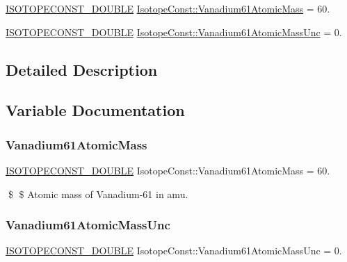 \begin{DoxyCompactItemize}
\item 
\mbox{\hyperlink{group___isotope_const-_macros_ga8f45a7272ce02c0b4c65c44636ed719a}{I\+S\+O\+T\+O\+P\+E\+C\+O\+N\+S\+T\+\_\+\+D\+O\+U\+B\+LE}} \mbox{\hyperlink{group___isotope_const-_vanadium-_v61_gaba2f25b1780fc9953d9ce5ebc96584cf}{Isotope\+Const\+::\+Vanadium61\+Atomic\+Mass}} = 60.
\item 
\mbox{\hyperlink{group___isotope_const-_macros_ga8f45a7272ce02c0b4c65c44636ed719a}{I\+S\+O\+T\+O\+P\+E\+C\+O\+N\+S\+T\+\_\+\+D\+O\+U\+B\+LE}} \mbox{\hyperlink{group___isotope_const-_vanadium-_v61_gae93ad228edad2cf164ad4f3a97a0b0a8}{Isotope\+Const\+::\+Vanadium61\+Atomic\+Mass\+Unc}} = 0.
\end{DoxyCompactItemize}


\subsection{Detailed Description}


\subsection{Variable Documentation}
\mbox{\label{group___isotope_const-_vanadium-_v61_gaba2f25b1780fc9953d9ce5ebc96584cf}} 
\subsubsection{\texorpdfstring{Vanadium61\+Atomic\+Mass}{Vanadium61AtomicMass}}
{\footnotesize\ttfamily \mbox{\hyperlink{group___isotope_const-_macros_ga8f45a7272ce02c0b4c65c44636ed719a}{I\+S\+O\+T\+O\+P\+E\+C\+O\+N\+S\+T\+\_\+\+D\+O\+U\+B\+LE}} Isotope\+Const\+::\+Vanadium61\+Atomic\+Mass = 60.}

\$ \$ Atomic mass of Vanadium-\/61 in amu. \mbox{\label{group___isotope_const-_vanadium-_v61_gae93ad228edad2cf164ad4f3a97a0b0a8}} 
\subsubsection{\texorpdfstring{Vanadium61\+Atomic\+Mass\+Unc}{Vanadium61AtomicMassUnc}}
{\footnotesize\ttfamily \mbox{\hyperlink{group___isotope_const-_macros_ga8f45a7272ce02c0b4c65c44636ed719a}{I\+S\+O\+T\+O\+P\+E\+C\+O\+N\+S\+T\+\_\+\+D\+O\+U\+B\+LE}} Isotope\+Const\+::\+Vanadium61\+Atomic\+Mass\+Unc = 0.}

